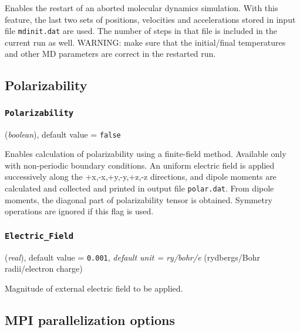 \documentclass{article}
\begin{document}
Enables the restart of an aborted molecular dynamics simulation.
With this feature, the last two
sets of positions, velocities and accelerations stored in input file
{\tt mdinit.dat} are used. The number of steps in that file is included in the
current run as well. WARNING: make sure that the initial/final
temperatures and other MD parameters are correct in the restarted run.










\subsection{Polarizability}

\subsubsection{\tt Polarizability 
\label{Polarizability}}
({\it boolean}),
default value = {\tt false }

Enables calculation of polarizability using a finite-field method. Available
only with non-periodic boundary conditions. An uniform electric field is
applied successively along the +x,-x,+y,-y,+z,-z directions, and dipole moments
are calculated and collected and printed in output file {\tt polar.dat}. From
dipole moments, the diagonal part of polarizability tensor is
obtained. Symmetry operations are ignored if this flag is used.

\subsubsection{\tt Electric\_Field 
\label{ElectricField}}
({\it real}),
default value = {\tt 0.001},
{\it default unit = ry/bohr/e} (rydbergs/Bohr radii/electron charge)

Magnitude of external electric field to be applied.












\subsection{MPI parallelization options}
\end{document}
